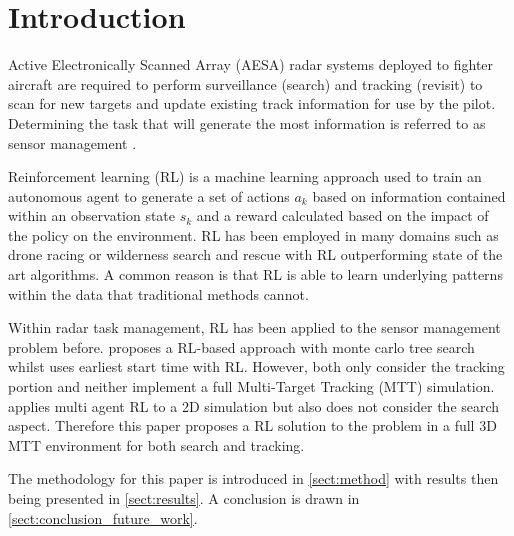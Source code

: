 \section{Introduction}
Active Electronically Scanned Array (AESA) radar systems deployed to fighter aircraft are required to perform surveillance (search) and tracking (revisit) \cite{white2008radar} to scan for new targets and update existing track information for use by the pilot. Determining the task that will generate the most information is referred to as sensor management \cite{hero2007foundations,hero2011sensor}.

Reinforcement learning (RL) is a machine learning approach used to train an autonomous agent to generate a set of actions $a_{k}$ based on information contained within an observation state $s_{k}$ and a reward calculated based on the impact of the policy on the environment. RL has been employed in many domains such as drone racing \cite{Kaufmann2023} or wilderness search and rescue \cite{Ewers2024} with RL outperforming state of the art algorithms. A common reason is that RL is able to learn underlying patterns within the data that traditional methods cannot.

Within radar task management, RL has been applied to the sensor management problem before. 
\cite{Shaghaghi2018} proposes a RL-based approach with monte carlo tree search whilst \cite{Qu2019} uses earliest start time with RL. However, both only consider the tracking portion and neither implement a full Multi-Target Tracking (MTT) simulation. \cite{Xiong2023} applies multi agent RL to a 2D simulation but also does not consider the search aspect. Therefore this paper proposes a RL solution to the problem in a full 3D MTT environment for both search and tracking. 

The methodology for this paper is introduced in \autoref{sect:method} with results then being presented in \autoref{sect:results}. A conclusion is drawn in \autoref{sect:conclusion_future_work}. 




